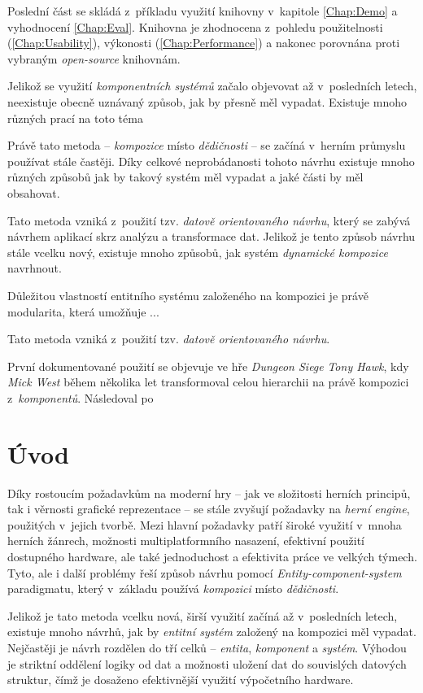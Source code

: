 Poslední část se skládá z~příkladu využití knihovny v~kapitole \ref{Chap:Demo} a vyhodnocení \ref{Chap:Eval}. Knihovna je zhodnocena z~pohledu použitelnosti (\ref{Chap:Usability}), výkonosti (\ref{Chap:Performance}) a nakonec porovnána proti vybraným \emph{open-source} knihovnám.

Jelikož se využití \emph{komponentních systémů} začalo objevovat až v~posledních letech, neexistuje obecně uznávaný způsob, jak by přesně měl vypadat. Existuje mnoho různých prací na toto téma

Právě tato metoda -- \emph{kompozice} místo \emph{dědičnosti} -- se začíná v~herním průmyslu používat stále častěji. Díky celkové neprobádanosti tohoto návrhu existuje mnoho různých způsobů jak by takový systém měl vypadat a jaké části by měl obsahovat.

Tato metoda vzniká z~použití tzv. \emph{datově orientovaného návrhu}\cite{DOD}, který se zabývá návrhem aplikací skrz analýzu a transformace dat. Jelikož je tento způsob návrhu stále vcelku nový, existuje mnoho způsobů, jak systém \emph{dynamické kompozice} navrhnout. 

Důležitou vlastností entitního systému založeného na kompozici je právě modularita, která umožňuje ...

Tato metoda vzniká z~použití tzv. \emph{datově orientovaného návrhu}\cite{DOD}.

První dokumentované použití se objevuje ve hře \emph{Dungeon Siege}\cite{DungeonSiege} \emph{Tony Hawk}, kdy \emph{Mick West} během několika let transformoval celou hierarchii na právě kompozici z~\emph{komponentů}. Následoval po

\fi

\chapter{Úvod}

Díky rostoucím požadavkům na moderní hry -- jak ve složitosti herních principů, tak i věrnosti grafické reprezentace -- se stále zvyšují požadavky na \emph{herní engine}, použitých v~jejich tvorbě. Mezi hlavní požadavky patří široké využití v~mnoha herních žánrech, možnosti multiplatformního nasazení, efektivní použití dostupného hardware, ale také jednoduchost a efektivita práce ve velkých týmech. Tyto, ale i další problémy řeší způsob návrhu pomocí \emph{Entity-component-system} paradigmatu, který v~základu používá \emph{kompozici} místo \emph{dědičnosti}.

Jelikož je tato metoda vcelku nová, širší využití začíná až v~posledních letech, existuje mnoho návrhů, jak by \emph{entitní systém} založený na kompozici měl vypadat. Nejčastěji je návrh rozdělen do tří celků -- \emph{entita}, \emph{komponent} a \emph{systém}. Výhodou je striktní oddělení logiky od dat a možnosti uložení dat do souvislých datových struktur, čímž je dosaženo efektivnější využití výpočetního hardware.

